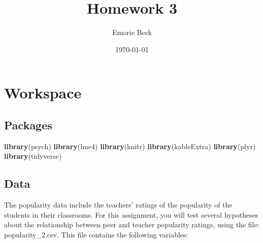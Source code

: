 \documentclass[]{article}
\title{Homework 3}
\author{Emorie Beck}
\date{\today}
\newenvironment{Shaded}{\begin{snugshade}}{\end{snugshade}}
\newcommand{\KeywordTok}[1]{\textcolor[rgb]{0.13,0.29,0.53}{\textbf{#1}}}
\newcommand{\DataTypeTok}[1]{\textcolor[rgb]{0.13,0.29,0.53}{#1}}
\newcommand{\DecValTok}[1]{\textcolor[rgb]{0.00,0.00,0.81}{#1}}
\newcommand{\StringTok}[1]{\textcolor[rgb]{0.31,0.60,0.02}{#1}}
\newcommand{\OperatorTok}[1]{\textcolor[rgb]{0.81,0.36,0.00}{\textbf{#1}}}
\newcommand{\NormalTok}[1]{#1}
\begin{document}
\maketitle

{
\setcounter{tocdepth}{2}
\tableofcontents
}
\section{Workspace}\label{workspace}

\subsection{Packages}\label{packages}

\begin{Shaded}
\begin{Highlighting}[]
\KeywordTok{library}\NormalTok{(psych)}
\KeywordTok{library}\NormalTok{(lme4)}
\KeywordTok{library}\NormalTok{(knitr)}
\KeywordTok{library}\NormalTok{(kableExtra)}
\KeywordTok{library}\NormalTok{(plyr)}
\KeywordTok{library}\NormalTok{(tidyverse)}
\end{Highlighting}
\end{Shaded}

\subsection{Data}\label{data}

\begin{Shaded}
\end{Shaded}

The popularity data include the teachers' ratings of the popularity of
the students in their classrooms. For this assignment, you will test
several hypotheses about the relationship between peer and teacher
popularity ratings, using the file: popularity\_2.csv. This file
contains the following variables:
\end{document}

